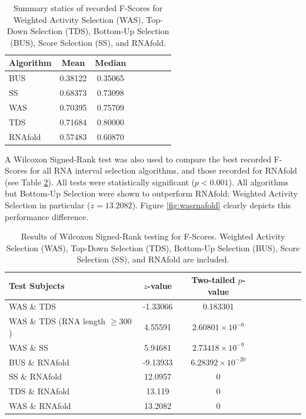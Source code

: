 \documentclass{cshonours}
\begin{document}
\begin{table}
\centering
\begin{tabular}{l*{6}{c}r}
Algorithm	& Mean & Median \\
\hline
BUS &  0.38122    &    0.35065   \\
SS & 0.68373    &    0.73098  \\
WAS & 0.70395   &     0.75709  \\
TDS & 0.71684   &     0.80000  \\
\hline
RNAfold & 0.57483    &    0.60870 \\
\end{tabular}

\caption{Summary statics of recorded F-Scores for Weighted Activity Selection (WAS), Top-Down Selection (TDS), Bottom-Up Selection (BUS), Score Selection (SS), and RNAfold.}
\label{tab:summaryselection}
\end{table}



A Wilcoxon Signed-Rank test was also used to compare the best recorded F-Scores for all RNA interval selection algorithms, and those recorded for RNAfold (see Table \ref{tab:wilcoxonselection}). All tests were statistically significant ($p < 0.001$). All algorithms but Bottom-Up Selection were shown to outperform RNAfold; Weighted Activity Selection in particular ($z = 13.2082$). Figure \ref{fig:wasrnafold} clearly depicts this performance difference.


\begin{table}
\centering
\begin{tabular}{l*{6}{c}r}
Test Subjects	& $z$-value & Two-tailed $p$-value \\
\hline
WAS \& TDS 	& -1.33066 &	0.183301 \\
WAS \& TDS (RNA length $\geq 300$)	& 4.55591 &	$2.60801 \times 10 ^{-6}$ \\
WAS \& SS & 5.94681 &	$2.73418 \times 10^{-9}$  \\
\hline
BUS \& RNAfold & -9.13933 &	$6.28392 \times 10^{-20}$  \\
SS \& RNAfold & 12.0957 &	0  \\
TDS \& RNAfold & 13.119 &	0  \\
WAS \& RNAfold & 13.2082 &	0  \\
\end{tabular}

\caption{Results of Wilcoxon Signed-Rank testing for F-Scores. Weighted Activity Selection (WAS), Top-Down Selection (TDS), Bottom-Up Selection (BUS), Score Selection (SS), and RNAfold are included.}
\label{tab:wilcoxonselection}
\end{table}
\end{document}
